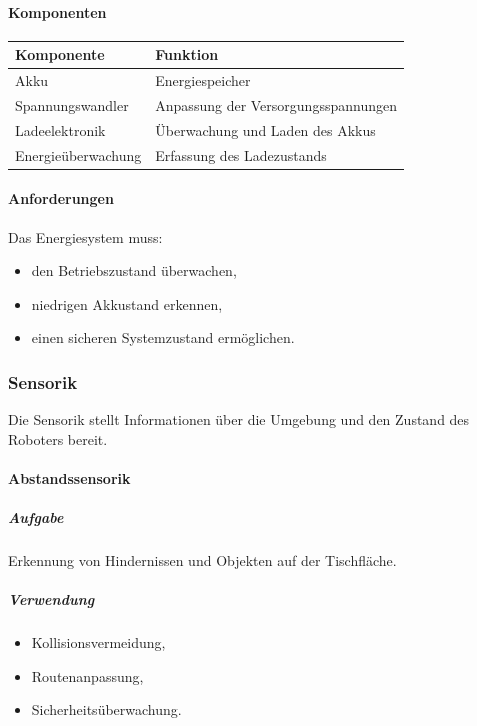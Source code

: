 \documentclass[
  a4paper,
  12pt,
  DIV=12,        %
  parskip=half,  %
  headings=small %
]{scrartcl}
\theoremstyle{definition}
\providecommand{\tightlist}{%
  \setlength{\itemsep}{0pt}\setlength{\parskip}{0pt}}
\theoremstyle{definition}
\begin{document}
\paragraph{Komponenten}\label{komponenten-1}

\begin{longtable}[]{@{}ll@{}}
\toprule\noalign{}
Komponente & Funktion \\
\midrule\noalign{}
\endhead
\bottomrule\noalign{}
\endlastfoot
Akku & Energiespeicher \\
Spannungswandler & Anpassung der Versorgungsspannungen \\
Ladeelektronik & Überwachung und Laden des Akkus \\
Energieüberwachung & Erfassung des Ladezustands \\
\end{longtable}

\paragraph{Anforderungen}\label{anforderungen-2}

Das Energiesystem muss:

\begin{itemize}
\tightlist
\item
  den Betriebszustand überwachen,
\item
  niedrigen Akkustand erkennen,
\item
  einen sicheren Systemzustand ermöglichen.
\end{itemize}

\subsubsection{Sensorik}\label{sensorik-1}

Die Sensorik stellt Informationen über die Umgebung und den Zustand des
Roboters bereit.

\paragraph{Abstandssensorik}\label{abstandssensorik}

\subparagraph{Aufgabe}\label{aufgabe-3}

Erkennung von Hindernissen und Objekten auf der Tischfläche.

\subparagraph{Verwendung}\label{verwendung}

\begin{itemize}
\tightlist
\item
  Kollisionsvermeidung,
\item
  Routenanpassung,
\item
  Sicherheitsüberwachung.
\end{itemize}
\end{document}
